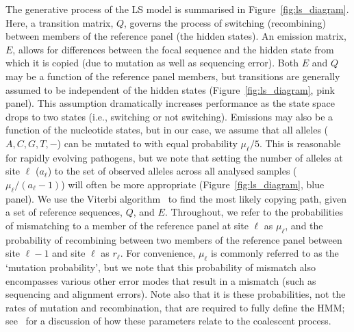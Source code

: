 \documentclass{article}
\begin{document}
%
%

The generative process of the LS model is summarised in
Figure~\ref{fig:ls_diagram}. Here, a transition matrix, $Q$, governs the
process of switching (recombining) between members of the reference panel (the
hidden states). An emission matrix, $E$, allows for differences between the
focal sequence and the hidden state from which it is copied (due to mutation as
well as sequencing error).
Both $E$ and $Q$ may be a function of the reference panel members,
but transitions are generally assumed to be independent of the
hidden states (Figure~\ref{fig:ls_diagram}, pink panel).
This assumption dramatically increases performance as the state space drops to two states (i.e., switching or not switching).
Emissions may also be a function of the nucleotide states, but in our
case, we assume that all alleles ($A,C,G,T,-$) can be mutated to with equal probability $\mu_\ell/5$. This is reasonable for rapidly evolving pathogens, but we note that setting the number of alleles at site $\ell$ ($a_\ell$) to the set of observed alleles across all analysed samples ($\mu_\ell/(a_\ell-1)$) will often be more appropriate
 (Figure~\ref{fig:ls_diagram}, blue panel).
We use the Viterbi algorithm~\citep{Viterbi1967-ol}
to find the most likely copying path, given a set of reference sequences, $Q$, and $E$.
Throughout, we refer to the probabilities of mismatching to a
member of the reference panel at site $\ell$ as $\mu_\ell$,
and the probability of recombining between two members of the reference panel between site $\ell-1$ and site $\ell$ as $r_\ell$. For convenience, $\mu_\ell$ is commonly referred to as the `mutation probability', but we note that this probability of
mismatch also encompasses various other error modes that result in a mismatch
(such as sequencing and alignment errors). Note also that it is these probabilities,
not the rates of mutation and recombination, that are required to fully define
the HMM; see~\cite{Donnelly2010-coalescent} for a discussion of how these
parameters relate to the coalescent process.
\end{document}
